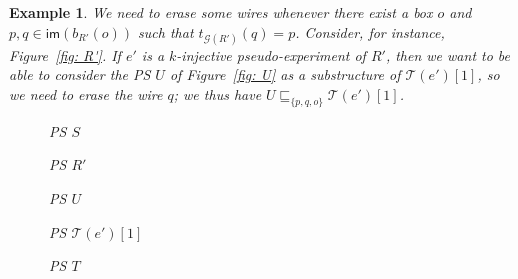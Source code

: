 \documentclass{article}
\newcommand{\target}[1]{t_{#1}}
\theoremstyle{plain}
\newtheorem{example}{Example}
\newtheorem{fact}[theorem]{Fact}
\newcommand{\taylor}[2]{\mathcal{T}(#1)[#2]}
\newcommand{\groundof}[1]{\mathcal{G}(#1)}
\def\restriction#1#2{\mathchoice
              {\setbox1\hbox{${\displaystyle #1}_{\scriptstyle #2}$}
              \restrictionaux{#1}{#2}}
              {\setbox1\hbox{${\textstyle #1}_{\scriptstyle #2}$}
              \restrictionaux{#1}{#2}}
              {\setbox1\hbox{${\scriptstyle #1}_{\scriptscriptstyle #2}$}
              \restrictionaux{#1}{#2}}
              {\setbox1\hbox{${\scriptscriptstyle #1}_{\scriptscriptstyle #2}$}
              \restrictionaux{#1}{#2}}}
\def\restrictionaux#1#2{{#1\,\smash{\vrule height .8\ht1 depth .85\dp1}}_{\,#2}}
\newcommand{\im}[1]{\textsf{im}(#1)}
\newcommand{\portsatzero}[1]{\mathcal{P}_0(#1)}
\newcommand{\wiresatzero}[1]{\mathcal{W}_0(#1)}
\newcommand{\exponentialportsatzero}[1]{\mathcal{P}_0^\textit{e}(#1)}
\newcommand{\boxesatzero}[1]{\mathcal{B}_{0}(#1)}
\newcommand{\scalefactbis}{0.4}
\newcommand{\pictbis}[1]{\scalebox{\scalefactbis}{}}
\newcommand{\scalefactter}{0.33}
\newcommand{\pictter}[1]{\scalebox{\scalefactter}{}}
\newcommand{\scalefactnine}{0.3}
\newcommand{\pictnine}[1]{\scalebox{\scalefactnine}{}}
\newcommand{\scalefactten}{0.45}
\newcommand{\pictten}[1]{\scalebox{\scalefactten}{}}
\begin{document}
\begin{example}
We need to erase some wires whenever there exist a box $o$ and $p, q \in \im{b_{R'}(o)}$ such that $\target{\groundof{R'}}(q) = p$. Consider, for instance, Figure~\ref{fig: R'}. If $e'$ is a $k$-injective pseudo-experiment of $R'$, then we want to be able to consider the PS $U$ of Figure~\ref{fig: U} as a substructure of $\taylor{e'}{1}$, so we need to erase the wire $q$; we thus have $U \sqsubseteq_{\{ p, q, o \}} \taylor{e'}{1}$.
\begin{figure}
\begin{minipage}{0.25\textwidth}
\centering
\pictbis{simple_net_bis}
\caption{PS $S$}\label{fig: no reconstruction of the experiment}
\end{minipage}
\centering
\begin{minipage}{0.17\textwidth}
\centering
\pictnine{S}
\caption{PS $R'$}
\label{fig: R'}
\end{minipage}\hfill
\begin{minipage}{0.16\textwidth}
\centering
\pictnine{U}
\caption{PS $U$}
\label{fig: U}
\end{minipage}
\begin{minipage}{0.21\textwidth}
\centering
\pictter{T_e_bis_1}
\caption{PS $\taylor{e'}{1}$}
\label{fig: T(e')[1]}
\end{minipage}
\begin{minipage}{0.14\textwidth}
\centering
\pictten{T}
\caption{PS $T$}
\label{fig: T}
\end{minipage}\hfill
\end{figure}
\end{example}

\begin{comment}
\begin{fact}\label{fact: adequate}
Let $S$ be a differential $\circ$-PS. Let $\mathcal{P} \subseteq \portsatzero{S}$ such that
\begin{enumerate} 
\item $(\forall w \in \wiresatzero{S} \setminus \mathcal{P}) (\target{\groundof{S}}(w) \in \mathcal{P} \Rightarrow \target{\groundof{S}}(w) \in \exponentialportsatzero{S})$
\item and $(\forall o_1 \in \boxesatzero{S} \cap \mathcal{P}) \im{b_S(o_1)} \subseteq \mathcal{P}$.
\end{enumerate}
Then there exists a substructure $R$ of $S$ such that $\portsatzero{R} = \mathcal{P}$ and $R \sqsubseteq_\emptyset S$.
\end{fact}


If the set $\mathcal{P}$ satisfies the conditions of the previous fact, then we denote by $\restriction{S}{\mathcal{P}}$ the unique substructure $R$ of $S$ such that $\portsatzero{R} = \mathcal{P}$ and $R \sqsubseteq_\emptyset S$. \end{comment}
\end{document}
